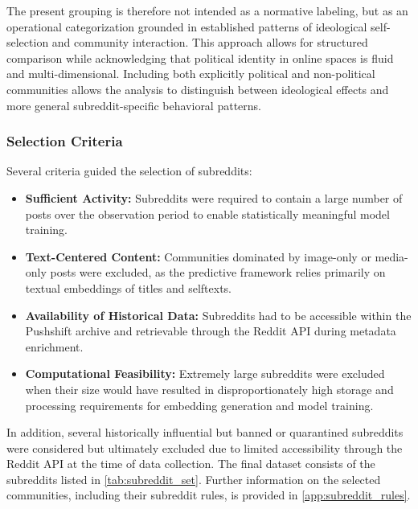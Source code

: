 The present grouping is therefore not intended as a normative labeling, but as an operational categorization grounded in established patterns of ideological self-selection and community interaction. This approach allows for structured comparison while acknowledging that political identity in online spaces is fluid and multi-dimensional. Including both explicitly political and non-political communities allows the analysis to distinguish between ideological effects and more general subreddit-specific behavioral patterns.

\subsubsection*{Selection Criteria}

Several criteria guided the selection of subreddits:

\begin{itemize}
    \item \textbf{Sufficient Activity:} Subreddits were required to contain a large number of posts over the observation period to enable statistically meaningful model training.
    
    \item \textbf{Text-Centered Content:} Communities dominated by image-only or media-only posts were excluded, as the predictive framework relies primarily on textual embeddings of titles and selftexts.
    
    \item \textbf{Availability of Historical Data:} Subreddits had to be accessible within the Pushshift archive and retrievable through the Reddit API during metadata enrichment.
    
    \item \textbf{Computational Feasibility:} Extremely large subreddits were excluded when their size would have resulted in disproportionately high storage and processing requirements for embedding generation and model training.
\end{itemize}

In addition, several historically influential but banned or quarantined subreddits were considered but ultimately excluded due to limited accessibility through the Reddit API at the time of data collection. The final dataset consists of the subreddits listed in \autoref{tab:subreddit_set}. Further information on the selected communities, including their subreddit rules, is provided in \autoref{app:subreddit_rules}.

